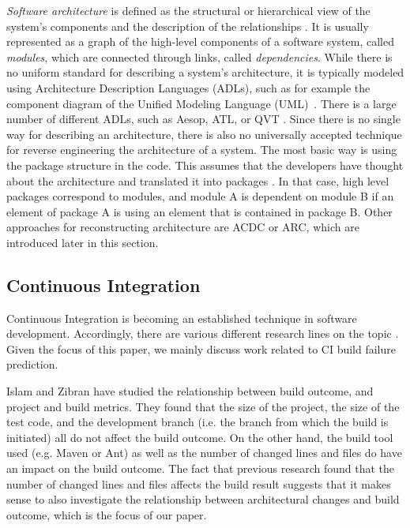 \documentclass[sigconf, anonymous, review]{acmart}
\begin{document}
\textit{Software architecture} is defined as the structural or hierarchical view of the system's components and the description of the relationships \cite{arcDef}. It is usually represented as a graph of the high-level components of a software system, called \textit{modules}, which are connected through links, called \textit{dependencies}. While there is no uniform standard for describing a system's architecture, it is typically modeled using Architecture Description Languages (ADLs), such as for example the component diagram of the Unified Modeling Language (UML)~\cite{UML-Arch}. There is a large number of different ADLs, such as Aesop, ATL, or QVT \cite{ADLs1, ADLs2}.
Since there is no single way for describing an architecture, there is also no universally accepted technique for reverse engineering the architecture of a system. The most basic way is using the package structure in the code. This assumes that the developers have thought about the architecture and translated it into packages \cite{arcPkg}. In that case, high level packages correspond to modules, and module A is dependent on module B if an element of package A is using an element that is contained in package B. 
Other approaches for reconstructing architecture are ACDC or ARC, which are introduced later in this section.

\subsection{Continuous Integration}

Continuous Integration is becoming an established technique in software development. Accordingly, there are various different research lines on the topic \cite{ci1, ci2, ci3, ci4}. Given the focus of this paper, we mainly discuss work related to CI build failure prediction.

Islam and Zibran \cite{FailsCorr} have studied the relationship between build outcome, and project and build metrics. 
They found that the size of the project, the size of the test code, and the development branch (i.e. the branch from which the build is initiated) all do not affect the build outcome.
On the other hand, the build tool used (e.g. Maven or Ant) as well as the number of changed lines and files do have an impact on the build outcome.
The fact that previous research found that the number of changed lines and files affects the build result suggests that it makes sense to also investigate the relationship between architectural changes and build outcome, which is the focus of our paper.
\end{document}
